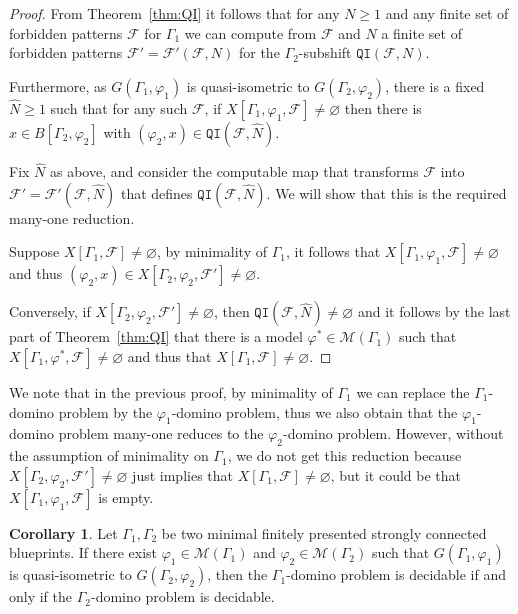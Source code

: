 \documentclass{article}
\theoremstyle{definition}
\newtheorem{corollary}[theorem]{Corollary}
\theoremstyle{definition}
\newcommand{\M}{\mathcal{M}}
\newcommand{\FF}{\mathcal{F}}
\newcommand{\Fo}{\mathcal{F}}
\newcommand{\QI}{\mathtt{QI}}
\begin{document}
    \begin{proof}
        From Theorem~\ref{thm:QI} it follows that for any $N \geq 1$ and any finite set of forbidden patterns $\FF$ for $\Gamma_1$ we can compute from $\FF$ and $N$ a finite set of forbidden patterns $\FF'=\FF'(\FF,N)$ for the $\Gamma_2$-subshift $\QI(\Fo,N)$.

        Furthermore, as $G(\Gamma_1, \varphi_1)$ is quasi-isometric to $G(\Gamma_2,\varphi_2)$, there is a fixed $\widehat{N}\geq 1$ such that for any such $\FF$, if $X[\Gamma_1,\varphi_1,\FF]\neq\varnothing$ then there is $x\in B[\Gamma_2,\varphi_2]$ with $(\varphi_2,x)\in \QI(\Fo,\widehat{N})$.

        Fix $\widehat{N}$ as above, and consider the computable map that transforms $\FF$ into $\FF'=\FF'(\FF,\widehat{N})$ that defines $\QI(\Fo,\widehat{N})$. We will show that this is the required many-one reduction.

        Suppose $X[\Gamma_1,\FF]\neq\varnothing$, by minimality of $\Gamma_1$, it follows that $X[\Gamma_1,\varphi_1,\FF]\neq\varnothing$ and thus $(\varphi_2,x)\in X[\Gamma_2,\varphi_2,\FF']\neq \varnothing$.

        Conversely, if $X[\Gamma_2,\varphi_2,\FF']\neq \varnothing$, then $\QI(\Fo,\widehat{N})\neq \varnothing$ and it follows by the last part of Theorem~\ref{thm:QI} that there is a model $\varphi^* \in \M(\Gamma_1)$ such that $X[\Gamma_1,\varphi^*,\FF]\neq \varnothing$ and thus that $X[\Gamma_1,\FF]\neq\varnothing$. \end{proof}

We note that in the previous proof, by minimality of $\Gamma_1$ we can replace the $\Gamma_1$-domino problem by the $\varphi_1$-domino problem, thus we also obtain that the $\varphi_1$-domino problem many-one reduces to the $\varphi_2$-domino problem. However, without the assumption of minimality on $\Gamma_1$, we do not get this reduction because $X[\Gamma_2,\varphi_2,\FF']\neq \varnothing$ just implies that $X[\Gamma_1,\FF]\neq \varnothing$, but it could be that $X[\Gamma_1,\varphi_1,\FF]$ is empty.

\begin{corollary}
    Let $\Gamma_1, \Gamma_2$ be two minimal finitely presented strongly connected blueprints. If there exist $\varphi_1\in\M(\Gamma_1)$ and $\varphi_2\in\M(\Gamma_2)$ such that $G(\Gamma_1, \varphi_1)$ is quasi-isometric to $G(\Gamma_2,\varphi_2)$, then the $\Gamma_1$-domino problem is decidable if and only if the $\Gamma_2$-domino problem is decidable.
\end{corollary}
\end{document}
